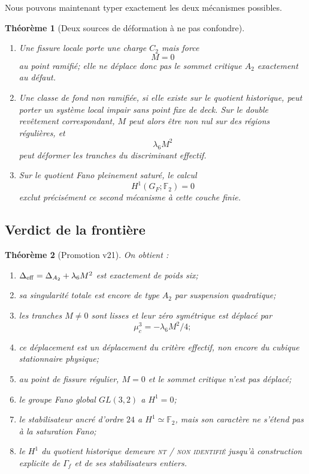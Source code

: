 \documentclass[11pt,a4paper]{article}
\newtheorem{theorem}{Théorème}[section]
\newcommand{\statusNT}{\textsc{nt / non identifié}}
\begin{document}
Nous pouvons maintenant typer exactement les deux mécanismes possibles.

\begin{theorem}[Deux sources de déformation à ne pas confondre]\label{thm:v21-topology-dynamics}
\begin{enumerate}[label=\textup{(\roman*)}]
\item Une fissure locale porte une charge $C_2$ mais force
\[
 M=0
\]
au point ramifié; elle ne déplace donc pas le sommet critique $A_2$ exactement au défaut.
\item Une classe de fond non ramifiée, si elle existe sur le quotient historique, peut porter un système local impair sans point fixe de deck. Sur le double revêtement correspondant, $M$ peut alors être non nul sur des régions régulières, et
\[
 \lambda_6M^2
\]
peut déformer les tranches du discriminant effectif.
\item Sur le quotient Fano pleinement saturé, le calcul
\[
 H^1(G_F;\mathbb F_2)=0
\]
exclut précisément ce second mécanisme à cette couche finie.
\end{enumerate}
\end{theorem}

\subsection{Verdict de la frontière}

\begin{theorem}[Promotion v21]\label{thm:v21-verdict}
On obtient :
\begin{enumerate}[label=\textup{(\roman*)}]
\item $\Delta_{\rm eff}=\Delta_{A_2}+\lambda_6M^2$ est exactement de poids six;
\item sa singularité totale est encore de type $A_2$ par suspension quadratique;
\item les tranches $M\neq0$ sont lisses et leur zéro symétrique est déplacé par
\[
 \mu_c^3=-\lambda_6M^2/4;
\]
\item ce déplacement est un déplacement du \emph{critère effectif}, non encore du cubique stationnaire physique;
\item au point de fissure régulier, $M=0$ et le sommet critique n'est pas déplacé;
\item le groupe Fano global $GL(3,2)$ a $H^1=0$;
\item le stabilisateur ancré d'ordre $24$ a $H^1\simeq\mathbb F_2$, mais son caractère ne s'étend pas à la saturation Fano;
\item le $H^1$ du quotient historique demeure \statusNT{} jusqu'à construction explicite de $\Gamma_f$ et de ses stabilisateurs entiers.
\end{enumerate}
\end{theorem}
\end{document}
